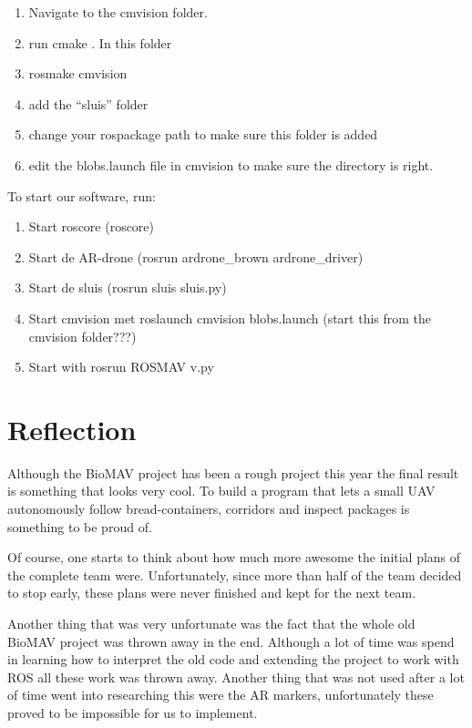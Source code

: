 \documentclass[a4paper,10pt]{article}
\begin{document}
\begin{enumerate}
\item Navigate to the cmvision folder.

\item run cmake . In this folder

\item rosmake cmvision

\item add the “sluis” folder

\item change your rospackage path to make sure this folder is added

\item edit the blobs.launch file in cmvision to make sure the directory is right.
\end{enumerate}

To start our software, run:
\begin{enumerate}
\item Start roscore (roscore)
\item Start de AR-drone (rosrun ardrone\_brown ardrone\_driver)
\item Start de sluis (rosrun sluis sluis.py)
\item Start cmvision met roslaunch cmvision blobs.launch (start this from the cmvision folder???)
\item Start with rosrun ROSMAV v.py
\end{enumerate}


\section{Reflection}

Although the BioMAV project has been a rough project this year the final result is something that looks very cool. 
To build a program that lets a small UAV autonomously follow bread-containers, corridors and inspect packages is something to be proud of. 

Of course, one starts to think about how much more awesome the initial plans of the complete team were. 
Unfortunately, since more than half of the team decided to stop early, these plans were never finished and kept for the next team. 

Another thing that was very unfortunate was the fact that the whole old BioMAV project was thrown away in the end. 
Although a lot of time was spend in learning how to interpret the old code and extending the project to work with ROS all these work was thrown away. 
Another thing that was not used after a lot of time went into researching this were the AR markers, unfortunately these proved to be impossible for us to implement. 
\end{document}
